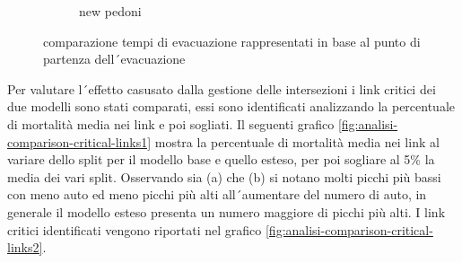 \begin{figure}
\begin{subfigure}{0.475\textwidth}
        \caption{new pedoni}
    \end{subfigure}
    \caption{comparazione tempi di evacuazione rappresentati in base al punto di partenza dell´evacuazione}
    \label{fig:analisi-comparison-ev-times-map}
\end{figure}

Per valutare l´effetto casusato dalla gestione delle intersezioni i link critici dei due modelli sono stati comparati,
essi sono identificati analizzando la percentuale di mortalità media nei link e poi sogliati.
Il seguenti grafico \ref{fig:analisi-comparison-critical-links1} mostra la percentuale di mortalità
media nei link al variare dello split per il modello base e quello esteso, per poi sogliare al 5\%
la media dei vari split.
Osservando sia (a) che (b) si notano molti picchi più bassi con meno auto ed meno picchi più alti
all´aumentare del numero di auto, in generale il modello esteso presenta un numero maggiore di picchi più alti. 
I link critici identificati vengono riportati nel grafico \ref*{fig:analisi-comparison-critical-links2}.

